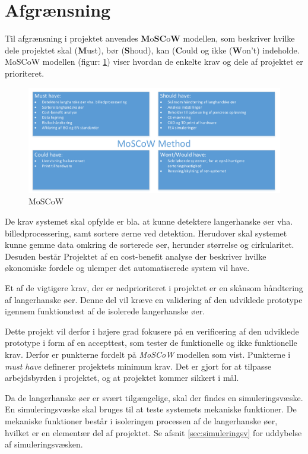 \newpage
\section{Afgrænsning}
Til afgrænsning i projektet anvendes \textbf{M}o\textbf{SC}o\textbf{W} modellen, som beskriver hvilke dele projektet skal (\textbf{M}ust), bør (\textbf{S}houd), kan (\textbf{C}ould og ikke (\textbf{W}on't) indeholde. MoSCoW modellen (figur: \ref{fig:moscow}) viser hvordan de enkelte krav og dele af projektet er prioriteret. 


\begin{figure}[H]
	\centering
	\includegraphics[width=1\textwidth]{billeder/MoSCoW-crop.pdf}
	\caption{MoSCoW}
	\label{fig:moscow}
\end{figure}

De krav systemet skal opfylde er bla. at kunne detektere langerhanske øer vha. billedprocessering, samt sortere øerne ved detektion. Herudover skal systemet kunne gemme data omkring de sorterede øer, herunder størrelse og cirkularitet. Desuden består Projektet af en cost-benefit analyse der beskriver hvilke økonomiske fordele og ulemper det automatiserede system vil have. 

Et af de vigtigere krav, der er nedprioriteret i projektet er en skånsom håndtering af langerhanske øer. Denne del vil kræve en validering af den udviklede prototype igennem funktionstest af de isolerede langerhanske øer. %

Dette projekt vil derfor i højere grad fokusere på en verificering af den udviklede prototype i form af en accepttest, som tester de funktionelle og ikke funktionelle krav. Derfor er punkterne  fordelt på \textit{MoSCoW} modellen som vist. Punkterne i \textit{must have} definerer projektets minimum krav. Det er gjort for at tilpasse arbejdsbyrden i projektet, og at projektet kommer sikkert i mål.

Da de langerhanske øer er svært tilgængelige, skal der findes en simuleringsvæske. En simuleringsvæske skal bruges til at teste systemets mekaniske funktioner. De mekaniske funktioner består i isoleringen processen af de langerhanske øer, hvilket er en elementær del af projektet. Se afsnit \ref{sec:simuleringsv} for uddybelse af simuleringsvæsken.

